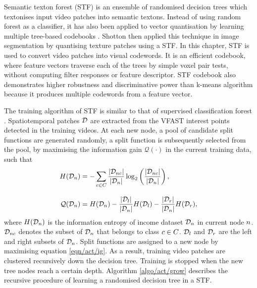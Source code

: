 Semantic texton forest (STF) is an ensemble of randomised decision trees which textonises input video patches into semantic textons. Instead of using random forest as a classifier, it has also been applied to vector quantisation by learning multiple tree-based codebooks \cite{Moosmann2007}. Shotton \etal \cite{Shotton2008} then applied this technique in image segmentation by quantising texture patches using a STF. In this chapter, STF is used to convert video patches into visual codewords.  
It is an efficient codebook, where feature vectors traverse each of the trees by simple voxel pair tests, without computing filter responses or feature descriptor. STF codebook also demonstrates higher robustness and discriminative power than k-means algorithm because it produces multiple codewords from a feature vector. 

The training algorithm of STF is similar to that of supervised classification forest \cite{Breiman2001}. Spatiotemporal patches $\mathcal{D}$ are extracted from the VFAST interest points detected in the training videos. 
At each new node, a pool of candidate split functions are generated randomly, a split function is subsequently selected from the pool, by maximising the information gain $\mathcal{Q}(\cdot)$ in the current training data, such that 
\begin{equation}
	\begin{aligned}
		H(\mathcal{D}_{n}) & = -\sum_{c \in C} \frac{|\mathcal{D}_{n c}|}{|\mathcal{D}_{n}|}\log_{2}\left(\frac{|\mathcal{D}_{n c}|}{|\mathcal{D}_{n}|}\right),\\[3mm] 
		\mathcal{Q}(\mathcal{D}_{n}) & = H(\mathcal{D}_{n}) - \frac{|\mathcal{D}_{l}|}{|\mathcal{D}_{n}|}H(\mathcal{D}_{l}) - \frac{|\mathcal{D}_{r}|}{|\mathcal{D}_{n}|}H(\mathcal{D}_{r}),
	\end{aligned}
	\label{eqn/act/ig}
\end{equation}
where $H(\mathcal{D}_{n})$ is the information entropy of income dataset $\mathcal{D}_{n}$ in current node $n$. $\mathcal{D}_{n c}$ denotes the subset of $\mathcal{D}_{n}$ that belongs to class $c \in C$. $\mathcal{D}_{l}$ and $\mathcal{D}_{r}$ are the left and right subsets of $\mathcal{D}_{n}$.
Split functions are assigned to a new node by maximising equation \ref{eqn/act/ig}. As a result, training video patches are clustered recursively down the decision tree. Training is stopped when the new tree nodes reach a certain depth. Algorithm \ref{algo/act/grow} describes the recursive procedure of learning a randomised decision tree in a STF.

